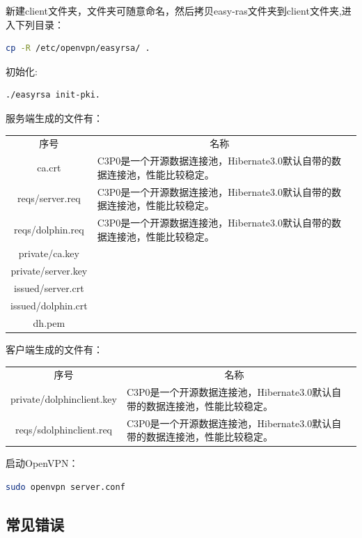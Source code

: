 \documentclass[letter]{book}
\begin{document}
新建client文件夹，文件夹可随意命名，然后拷贝easy-ras文件夹到client文件夹,进入下列目录：

\begin{lstlisting}[language=Bash]
cp -R /etc/openvpn/easyrsa/ .
\end{lstlisting}

初始化:

\begin{lstlisting}[language=Bash]
./easyrsa init-pki.
\end{lstlisting}

服务端生成的文件有：

\begin{tabular}{|c|p{8cm}|c|}
	\hline
	\multirow{1}{*}{序号}
	& \multicolumn{1}{c|}{名称}  \\			
	\cline{1-2}
	ca.crt  & C3P0是一个开源数据连接池，Hibernate3.0默认自带的数据连接池，性能比较稳定。\\
	\hline
	reqs/server.req  & C3P0是一个开源数据连接池，Hibernate3.0默认自带的数据连接池，性能比较稳定。\\
	\hline
	reqs/dolphin.req  & C3P0是一个开源数据连接池，Hibernate3.0默认自带的数据连接池，性能比较稳定。\\
	\hline
	private/ca.key & \\
	\hline
	private/server.key & \\
	issued/server.crt & \\
	issued/dolphin.crt & \\
	dh.pem & \\
	\hline
\end{tabular}

客户端生成的文件有：

\begin{tabular}{|c|p{8cm}|c|}
	\hline
	\multirow{1}{*}{序号}
	& \multicolumn{1}{c|}{名称}  \\			
	\cline{1-2}
	private/dolphinclient.key  & C3P0是一个开源数据连接池，Hibernate3.0默认自带的数据连接池，性能比较稳定。\\
	\hline
	reqs/sdolphinclient.req & C3P0是一个开源数据连接池，Hibernate3.0默认自带的数据连接池，性能比较稳定。\\
	\hline
\end{tabular}

启动OpenVPN：

\begin{lstlisting}[language=Bash]
sudo openvpn server.conf
\end{lstlisting}

\subsection{常见错误}
\end{document}
